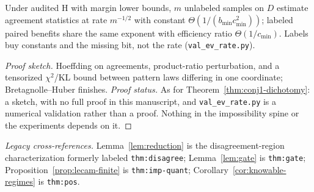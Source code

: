 \begin{theorem}\label{thm:ev-rate}
Under audited H with margin lower bounds, $m$ unlabeled samples on $D$ estimate agreement
statistics at rate $m^{-1/2}$ with constant $\Theta(1/(b_{\min}c_{\min}^2))$; labeled paired
benefits share the same exponent with efficiency ratio $\Theta(1/c_{\min})$. Labels buy constants
and the missing bit, not the rate (\texttt{val\_ev\_rate.py}).
\end{theorem}
\begin{proof}[Proof sketch]
Hoeffding on agreements, product-ratio perturbation, and a tensorized $\chi^2$/KL bound between
pattern laws differing in one coordinate; Bretagnolle--Huber finishes.
\emph{Proof status.} As for Theorem~\ref{thm:conj1-dichotomy}: a sketch, with no full proof in
this manuscript, and \texttt{val\_ev\_rate.py} is a numerical validation rather than a proof.
Nothing in the impossibility spine or the experiments depends on it.
\end{proof}

\smallskip
\noindent\emph{Legacy cross-references.} Lemma~\ref{lem:reduction} is the disagreement-region
characterization formerly labeled \texttt{thm:disagree}; Lemma~\ref{lem:gate} is
\texttt{thm:gate}; Proposition~\ref{prop:lecam-finite} is \texttt{thm:imp-quant};
Corollary~\ref{cor:knowable-regimes} is \texttt{thm:pos}.
